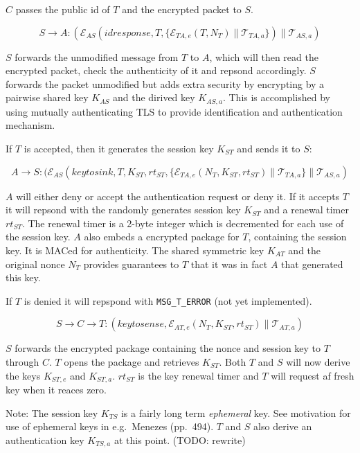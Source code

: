 $C$ passes the public id of $T$ and the encrypted packet to $S$.

\[
S \rightarrow A: (\mathcal{E}_{AS}(idresponse,T, \{
\mathcal{E}_{TA,e}(T,N_T) \parallel \mathcal{T}_{TA,a} \}) \parallel
\mathcal{T}_{AS,a})
\]

$S$ forwards the unmodified message from $T$ to $A$, which will then
read the encrypted packet, check the authenticity of it and repsond
accordingly. $S$ forwards the packet unmodified but adds extra security
by encrypting by a pairwise shared key $K_{AS}$ and the dirived key
$K_{AS,a}$. This is accomplished by using mutually authenticating TLS
to provide identification and authentication mechanism.

If $T$ is accepted, then it generates the session key
$K_{ST}$ and sends it to $S$:

\[
A \rightarrow S: (\mathcal{E}_{AS}(keytosink,T,K_{ST},rt_{ST}, \{
\mathcal{E}_{TA,e}(N_T,K_{ST},rt_{ST}) \parallel \mathcal{T}_{TA,a}
\} \parallel \mathcal{T}_{AS,a})
\]


$A$ will either deny or accept the authentication request or deny
it. If it accepts $T$ it will repsond with the randomly generates
session key $K_{ST}$ and a renewal timer $rt_{ST}$. The renewal timer
is a 2-byte integer which is decremented for each use of the session
key. $A$ also embeds a encrypted package for $T$, containing the
session key. It is MACed for authenticity. The shared symmetric key
$K_{AT}$ and the original nonce $N_T$ provides guarantees to $T$ that
it was in fact $A$ that generated this key.

If $T$ is denied it will repspond with \texttt{MSG\_T\_ERROR} (not yet implemented). 


\[
S \rightarrow C \rightarrow T: (keytosense,\mathcal{E}_{AT,e}(N_T,K_{ST},rt_{ST}) \parallel \mathcal{T}_{AT,a})
\]

$S$ forwards the encrypted package containing the nonce and session
key to $T$ through $C$. $T$ opens the package and retrieves
$K_{ST}$. Both $T$ and $S$ will now derive the keys $K_{ST,e}$ and
$K_{ST,a}$. $rt_{ST}$ is the key renewal timer and $T$ will request af
fresh key when it reaces zero.

Note: The session key $K_{TS}$ is a fairly long term
\textit{ephemeral} key. See motivation for use of ephemeral keys in
e.g.\ Menezes (pp.\ 494). $T$ and $S$ also derive an authentication
key $K_{TS,a}$ at this point. (TODO: rewrite)

